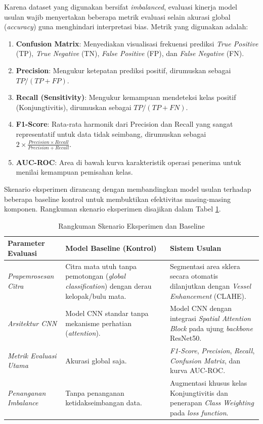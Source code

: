 Karena dataset yang digunakan bersifat \textit{imbalanced}, evaluasi kinerja model usulan wajib menyertakan beberapa metrik evaluasi selain akurasi global (\textit{accuracy}) guna menghindari interpretasi bias. Metrik yang digunakan adalah:
\begin{enumerate}
  \item \textbf{Confusion Matrix}: Menyediakan visualisasi frekuensi prediksi \textit{True Positive} (TP), \textit{True Negative} (TN), \textit{False Positive} (FP), dan \textit{False Negative} (FN).
  \item \textbf{Precision}: Mengukur ketepatan prediksi positif, dirumuskan sebagai $TP / (TP + FP)$.
  \item \textbf{Recall (Sensitivity)}: Mengukur kemampuan mendeteksi kelas positif (Konjungtivitis), dirumuskan sebagai $TP / (TP + FN)$.
  \item \textbf{F1-Score}: Rata-rata harmonik dari Precision dan Recall yang sangat representatif untuk data tidak seimbang, dirumuskan sebagai $2 \times \frac{Precision \times Recall}{Precision + Recall}$.
  \item \textbf{AUC-ROC}: Area di bawah kurva karakteristik operasi penerima untuk menilai kemampuan pemisahan kelas.
\end{enumerate}

Skenario eksperimen dirancang dengan membandingkan model usulan terhadap beberapa baseline kontrol untuk membuktikan efektivitas masing-masing komponen. Rangkuman skenario eksperimen disajikan dalam Tabel \ref{tab:skenario-baseline}.

\begin{table}[!ht]
\centering
\footnotesize
\caption{Rangkuman Skenario Eksperimen dan Baseline}
\label{tab:skenario-baseline}
\begin{tabular}{|p{3cm}|p{4.5cm}|p{4.5cm}|}
\hline
\textbf{Parameter Evaluasi} & \textbf{Model Baseline (Kontrol)} & \textbf{Sistem Usulan} \\
\hline
\textit{Prapemrosesan Citra} & Citra mata utuh tanpa pemotongan (\textit{global classification}) dengan derau kelopak/bulu mata. & Segmentasi area sklera secara otomatis dilanjutkan dengan \textit{Vessel Enhancement} (CLAHE). \\
\hline
\textit{Arsitektur CNN} & Model CNN standar tanpa mekanisme perhatian (\textit{attention}). & Model CNN dengan integrasi \textit{Spatial Attention Block} pada ujung \textit{backbone} ResNet50. \\
\hline
\textit{Metrik Evaluasi Utama} & Akurasi global saja. & \textit{F1-Score}, \textit{Precision}, \textit{Recall}, \textit{Confusion Matrix}, dan kurva AUC-ROC. \\
\hline
\textit{Penanganan Imbalance} & Tanpa penanganan ketidakseimbangan data. & Augmentasi khusus kelas Konjungtivitis dan penerapan \textit{Class Weighting} pada \textit{loss function}. \\
\hline
\end{tabular}
\end{table}

